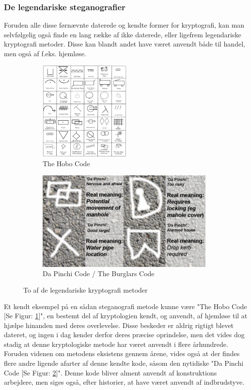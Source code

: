 \subsubsection{De legendariske steganografier}
Foruden alle disse førnævnte daterede og kendte former for kryptografi, kan man selvfølgelig også finde en lang række af ikke daterede, eller ligefrem legendariske kryptografi metoder. Disse kan blandt andet have været anvendt både til handel, men også af f.eks. hjemløse.
\begin{figure}[H]
    \begin{subfigure}{0.5\textwidth}
    \includegraphics[width=0.9\linewidth, height=5cm]{Projectdoc/Problemanalyse/Illustrationer/hobo-glyphs-code.jpg} 
    \caption{The Hobo Code}
    \label{fig:hobocode}
    \end{subfigure}
    \begin{subfigure}{0.5\textwidth}
    \includegraphics[width=0.9\linewidth, height=5cm]{Projectdoc/Problemanalyse/Illustrationer/BurglarsCode.jpg}
    \caption{Da Pinchi Code / The Burglars Code}
    \label{fig:burglarscode}
    \end{subfigure}
    \caption{To af de legendariske kryptografi metoder}
    \label{fig:legendscode}
\end{figure}
\noindent
Et kendt eksempel på en sådan steganografi metode kunne være "The Hobo Code [Se Figur: \ref{fig:hobocode}]", en bestemt del af kryptologien kendt, og anvendt, af hjemløse til at hjælpe hinanden med deres overlevelse\cite{TheHoboCode}. Disse beskeder er aldrig rigtigt blevet dateret, og ingen i dag kender derfor deres præcise oprindelse, men det vides dog stadig at denne kryptologiske metode har været anvendt i flere århundrede.\\ 
Foruden videnen om metodens eksistens gennem årene, vides også at der findes flere andre ligende afarter af denne kendte kode, såsom den nytidiske "Da Pinchi Code [Se Figur: \ref{fig:burglarscode}]". Denne kode bliver alment anvendt af konstruktions arbejdere, men siges også, efter historier, at have været anvendt af indbrudstyve.\cite{DaPinchiCode}

